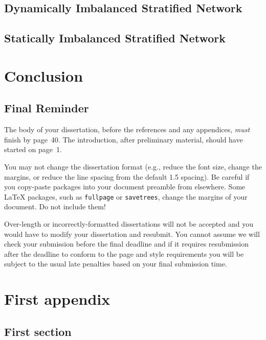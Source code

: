 \documentclass[logo,msc,cyber]{infthesis}   %
\begin{document}
\section{Dynamically Imbalanced Stratified Network}

\section{Statically Imbalanced Stratified Network}

\chapter{Conclusion}

\section{Final Reminder}

The body of your dissertation, before the references and any appendices,
\emph{must} finish by page~40. The introduction, after preliminary material,
should have started on page~1.

You may not change the dissertation format (e.g., reduce the font size, change
the margins, or reduce the line spacing from the default 1.5 spacing). Be
careful if you copy-paste packages into your document preamble from elsewhere.
Some \LaTeX{} packages, such as \texttt{fullpage} or \texttt{savetrees}, change
the margins of your document. Do not include them!

Over-length or incorrectly-formatted dissertations will not be accepted and you
would have to modify your dissertation and resubmit. You cannot assume we will
check your submission before the final deadline and if it requires resubmission
after the deadline to conform to the page and style requirements you will be
subject to the usual late penalties based on your final submission time.





\appendix

\chapter{First appendix}

\section{First section}
\end{document}
